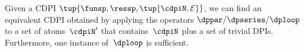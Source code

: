 \begin{proposition}
    \label{prop:reduction}
    Given a CDPI $\tup{ \funsp,\ressp,\tup{ \cdpiN,\mathcal{E}} } $, we can find an equivalent CDPI obtained by applying the operators $\dppar/\dpseries/\dploop$ to a set of atoms~$\cdpiN'$ that contains~$\cdpiN$ plus a set of trivial DPIs.
    Furthermore, one instance of~$\dploop$ is sufficient.
\end{proposition}
